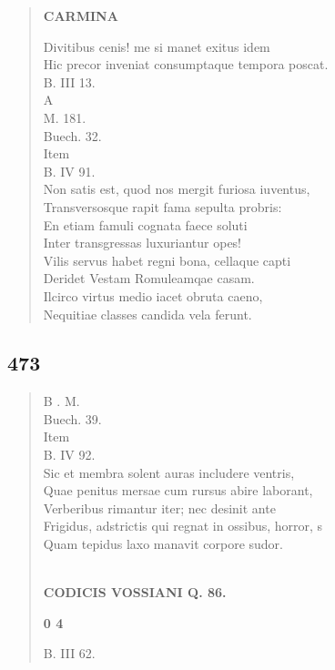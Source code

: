 \documentclass[11pt, a4paper]{report}
\begin{document}
\begin{verse}
    \begin{center} \textbf{CARMINA} \end{center} \marginpar{[346]} Divitibus cenis! me si manet exitus idem \\ Hic precor inveniat consumptaque tempora poscat. \\ B. III 13. \\ A \\ M. 181. \\ Buech. 32. \\ Item \\ B. IV 91. \\ Non satis est, quod nos mergit furiosa iuventus, \\ Transversosque rapit fama sepulta probris: \\ En etiam famuli cognata faece soluti \\ Inter transgressas luxuriantur opes! \\ Vilis servus habet regni bona, cellaque capti \\ Deridet Vestam Romuleamqae casam. \\ Ilcirco virtus medio iacet obruta caeno, \\ Nequitiae classes candida vela ferunt. \\ 
      \end{verse}
  
            \subsection*{473}
      \begin{verse}
      B . M. \\ Buech. 39. \\ Item \\ B. IV 92. \\ Sic et membra solent auras includere ventris, \\ Quae penitus mersae cum rursus abire laborant, \\ Verberibus rimantur iter; nec desinit ante \\ Frigidus, adstrictis qui regnat in ossibus, horror, s \\ Quam tepidus laxo manavit corpore sudor. \\ 
        ﻿\pagebreak 
    \begin{center} \textbf{CODICIS VOSSIANI Q. 86.} \end{center}\begin{center} \textbf{0 4} \end{center}B. III 62. \\ 
      \end{verse}
  
\end{document}
